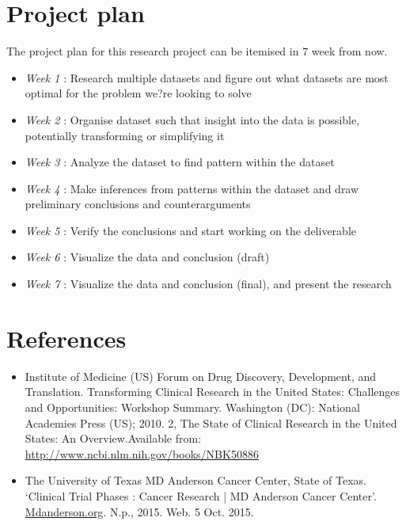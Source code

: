 \documentclass[paper=a4, fontsize=12pt]{article}
\begin{document}
\section*{Project plan}
The project plan for this research project can be itemised in 7 week from now.\\
\begin{itemize}
\item{\emph{Week 1}} : Research multiple datasets and figure out what datasets are most optimal for the problem we?re looking to solve
\item{\emph{Week 2}} : Organise dataset such that insight into the data is possible, potentially transforming or simplifying it
\item{\emph{Week 3}} : Analyze the dataset to find pattern within the dataset
\item{\emph{Week 4}} : Make inferences from patterns within the dataset and draw preliminary conclusions and counterarguments
\item{\emph{Week 5}} : Verify the conclusions and start working on the deliverable
\item{\emph{Week 6}} : Visualize the data and conclusion (draft)
\item{\emph{Week 7}} : Visualize the data and conclusion (final), and present the research
\end{itemize}


\section*{References}
\begin{itemize}
\item Institute of Medicine (US) Forum on Drug Discovery, Development, and Translation. Transforming Clinical Research in the United States: Challenges and Opportunities: Workshop Summary. Washington (DC): National Academies Press (US); 2010. 2, The State of Clinical Research in the United States: An Overview.Available from: \href{http://www.ncbi.nlm.nih.gov/books/NBK50886}{http://www.ncbi.nlm.nih.gov/books/NBK50886}
\item The University of Texas MD Anderson Cancer Center, State of Texas. `Clinical Trial Phases : Cancer Research | MD Anderson Cancer Center'. \href{Mdanderson.org}{Mdanderson.org}. N.p., 2015. Web. 5 Oct. 2015.
\end{itemize}
\end{document}
